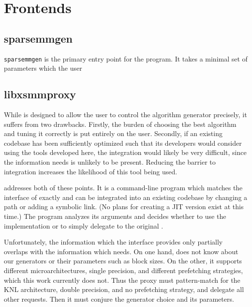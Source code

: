 \section{Frontends}



\subsection{sparsemmgen}

\texttt{sparsemmgen} is the primary entry point for the program. It takes a minimal set of parameters which the user 

\subsection{libxsmmproxy}

While  is designed to allow the user to control the algorithm generator precisely, it suffers from two drawbacks. Firstly, the burden of choosing the best algorithm and tuning it correctly is put entirely on the user. Secondly, if an existing codebase has been sufficiently optimized such that its developers would consider using the tools developed here, the integration would likely be very difficult, since the information  needs is unlikely to be present. Reducing the barrier to integration increases the likelihood of this tool being used.

 addresses both of these points. It is a command-line program which matches the interface of  exactly and can be integrated into an existing codebase by changing a path or adding a symbolic link. (No plans for creating a JIT version exist at this time.) The program analyzes its arguments and decides whether to use the  implementation or to simply delegate to the original .

Unfortunately, the information which the  interface provides only partially overlaps with the information which  needs. On one hand,  does not know about our generators or their parameters such as block sizes. On the other, it supports different microarchitectures, single precision, and different prefetching strategies, which this work currently does not. Thus the proxy must pattern-match for the KNL architecture, double precision, and no prefetching strategy, and delegate all other requests. Then it must conjure the generator choice and its parameters.

